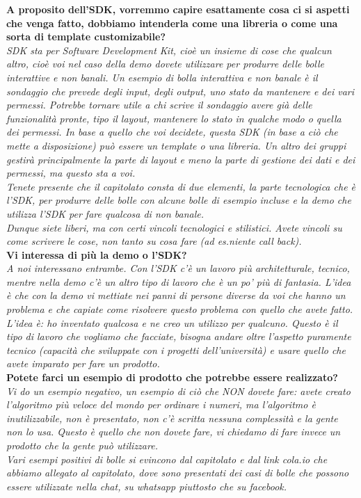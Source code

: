 \documentclass[10 pt,a4paper, openany]{article}
\begin{document}
\textbf{A proposito dell'SDK, vorremmo capire esattamente cosa ci si
  aspetti che venga fatto, dobbiamo intenderla come una libreria o come una sorta di template customizabile?}\\
\textit{SDK sta per Software Development Kit, cioè un insieme di cose che qualcun
  altro, cioè voi nel caso della demo dovete utilizzare per produrre delle bolle interattive
  e non banali. Un esempio di bolla interattiva e non banale è il sondaggio
  che prevede degli input, degli output, uno stato da mantenere e dei vari
  permessi. Potrebbe tornare utile a chi scrive il sondaggio avere già delle
  funzionalità pronte, tipo il layout, mantenere lo stato in qualche modo o
  quella dei permessi. In base a quello che voi decidete, questa SDK (in base a
  ciò che mette a disposizione) può essere un template o una libreria. Un altro
  dei gruppi gestirà principalmente la parte di layout e meno la parte di gestione
  dei dati e dei permessi, ma questo sta a voi.\\
  Tenete presente che il capitolato consta di due elementi, la parte tecnologica
  che è l'SDK, per produrre delle bolle con alcune bolle di esempio incluse
  e la demo che utilizza l'SDK per fare qualcosa di non banale.\\
  Dunque siete liberi, ma con certi vincoli tecnologici e stilistici. Avete vincoli
  su come scrivere le cose, non tanto su cosa fare (ad es.niente call back).}\\

\textbf{Vi interessa di più la demo o l'SDK?}\\
\textit{A noi interessano entrambe. Con l'SDK c'è un lavoro più architetturale,
  tecnico, mentre nella demo c'è un altro tipo di lavoro che è un po' più di
  fantasia. L'idea è che con la demo vi mettiate nei panni di persone diverse
  da voi che hanno un problema e che capiate come risolvere questo problema con
  quello che avete fatto. L'idea è: ho inventato qualcosa e ne creo un utilizzo per
  qualcuno. Questo è il tipo di lavoro che vogliamo che facciate, bisogna andare
  oltre l'aspetto puramente tecnico (capacità che sviluppate con i progetti
  dell'università) e usare quello che avete imparato per fare un prodotto.}\\

\textbf{Potete farci un esempio di prodotto che potrebbe essere realizzato?}\\
\textit{Vi do un esempio negativo, un esempio di ciò che NON dovete fare: avete creato
  l'algoritmo più veloce del mondo per ordinare i numeri, ma l'algoritmo è
  inutilizzabile, non è presentato, non c'è scritta nessuna complessità e la gente
  non lo usa. Questo è quello che non dovete fare, vi chiedamo di fare invece
  un prodotto che la gente può utilizzare.\\
  Vari esempi positivi di bolle si evincono dal capitolato e dal link cola.io
  che abbiamo allegato al capitolato, dove sono presentati dei casi di bolle che
  possono essere utilizzate nella chat, su whatsapp piuttosto che su facebook.}\\
\end{document}

